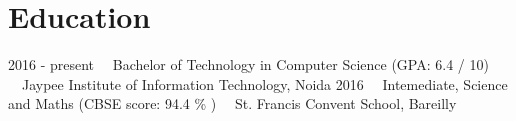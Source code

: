 \documentclass[letterpaper]{twentysecondcv} %
\begin{document}
\makeprofile %

\section{Education}

\begin{twenty} %
	\twentyitem
    	{2016 - present}
        {}
        {~~Bachelor of Technology in Computer Science \textnormal{(GPA: 6.4 / 10)}}
        {{}{}}
        {{}{~~Jaypee Institute of Information Technology, Noida}}
        {}
	\twentyitem
    	{2016}
		{}
        {~~Intemediate, Science and Maths \textnormal{(CBSE score: 94.4 \% )}}
        {}
        {{}{~~St. Francis Convent School, Bareilly}}
        {}
\end{twenty}
\end{document}
